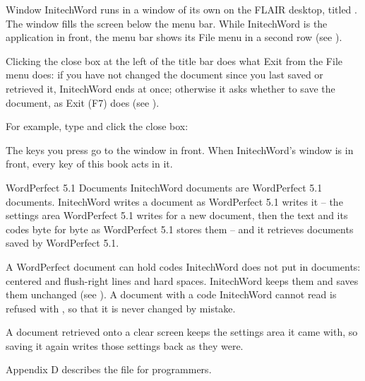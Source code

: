 \begin{Feature}{Window}
InitechWord runs in a window of its own on the FLAIR desktop, titled
.  The window fills the screen below the menu bar.  While
InitechWord is the application in front, the menu bar shows its File menu
in a second row (see ).

\Notes
{}
Clicking the close box at the left of the title bar does what Exit from the
File menu does: if you have not changed the document since you last saved
or retrieved it, InitechWord ends at once; otherwise it asks whether to save
the document, as Exit (F7) does (see ).

For example, type  and click the close
box\CloseBox:
\EndReplay

The keys you press go to the window in front.  When InitechWord's window is
in front, every key of this book acts in it.

\end{Feature}

\begin{Feature}{WordPerfect 5.1 Documents}
InitechWord documents are WordPerfect 5.1 documents.  InitechWord writes a
document as WordPerfect 5.1 writes it -- the settings area WordPerfect 5.1
writes for a new document, then the text and its codes byte for byte as
WordPerfect 5.1 stores them -- and it retrieves documents saved by
WordPerfect 5.1.

\Notes
{}
A WordPerfect document can hold codes InitechWord does not put in documents:
centered and flush-right lines and hard spaces.  InitechWord keeps them and
saves them unchanged (see ).  A document with a code
InitechWord cannot read is refused with , so that it is never changed by mistake.

A document retrieved onto a clear screen keeps the settings area it came
with, so saving it again writes those settings back as they were.

Appendix D describes the file for programmers.

\end{Feature}

